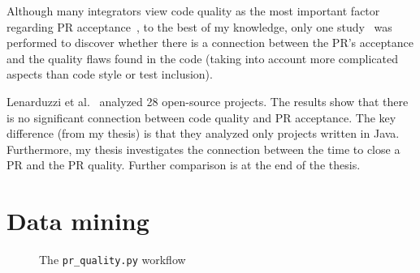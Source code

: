 \documentclass[digital,oneside,oldtable,nolof,nolot,nocover]{fithesis4}
\begin{document}
Although many integrators view code quality as the most important factor
regarding PR acceptance~\cite{integrator}, to the best of my knowledge, only
one study~\cite{quality} was performed to discover whether there is a
connection between the PR's acceptance and the quality flaws found in the
code (taking into account more complicated aspects than code style or test
inclusion).

Lenarduzzi et al.~\cite{quality} analyzed 28 open-source projects. The results show that
there is no significant connection between code quality and PR acceptance.
The key difference (from my thesis) is that they analyzed only projects written
in Java. Furthermore, my thesis investigates the connection between the time to close a
PR and the PR quality. Further comparison is at the end of the thesis.
\chapter{Data mining}
\label{sec:org91f0159}
\begin{figure}[htb]\centering
{}
\caption{The \texttt{pr\_quality.py} workflow}\label{fig:mining_workflow}
\end{figure}
\end{document}
